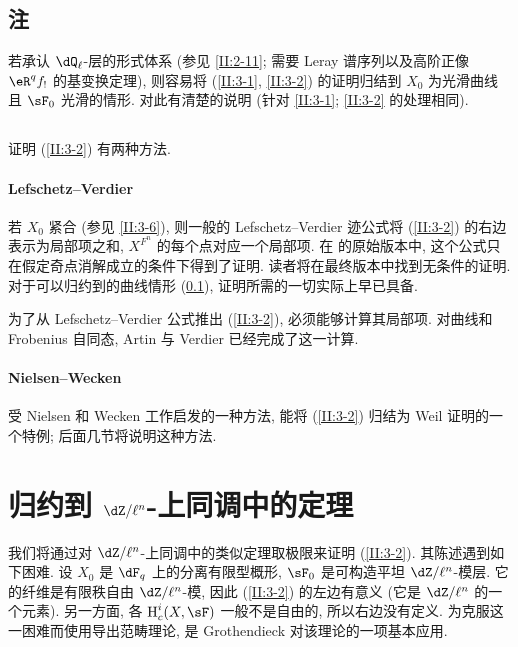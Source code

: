 \subsection{注}\label{II:3-7}

若承认 $\dQ_\ell$-层的形式体系 (参见 \ref{II:2-11}; 需要 Leray 谱序列以及高阶正像 $\eR^q f_!$ 的基变换定理), 则容易将 (\ref{II:3-1}, \ref{II:3-2}) 的证明归结到 $X_0$ 为光滑曲线且 $\sF_0$ 光滑的情形. \cite[\S 5]{gr95} 对此有清楚的说明 (针对 \ref{II:3-1}; \ref{II:3-2} 的处理相同).

\subsection{}\label{II:3-8}

证明 (\ref{II:3-2}) 有两种方法.

\paragraph{Lefschetz--Verdier}
若 $X_0$ 紧合 (参见 \ref{II:3-6}), 则一般的 Lefschetz--Verdier 迹公式将 (\ref{II:3-2}) 的右边表示为局部项之和, $X^{F^n}$ 的每个点对应一个局部项. 在 \cite{sga5} 的原始版本中, 这个公式只在假定奇点消解成立的条件下得到了证明. 读者将在最终版本中找到无条件的证明. 对于可以归约到的曲线情形 (\ref{II:3-7}), 证明所需的一切实际上早已具备.

为了从 Lefschetz--Verdier 公式推出 (\ref{II:3-2}), 必须能够计算其局部项. 对曲线和 Frobenius 自同态, Artin 与 Verdier \cite{ve67} 已经完成了这一计算.

\paragraph{Nielsen--Wecken}
受 Nielsen 和 Wecken 工作启发的一种方法, 能将 (\ref{II:3-2}) 归结为 Weil 证明的一个特例; 后面几节将说明这种方法.

\section{归约到 \texorpdfstring{$\dZ/\ell^n$}{Z/l n}-上同调中的定理}\label{II:4}

我们将通过对 $\dZ/\ell^n$-上同调中的类似定理取极限来证明 (\ref{II:3-2}). 其陈述遇到如下困难. 设 $X_0$ 是 $\dF_q$ 上的分离有限型概形, $\sF_0$ 是可构造平坦 $\dZ/\ell^n$-模层. 它的纤维是有限秩自由 $\dZ/\ell^n$-模, 因此 (\ref{II:3-2}) 的左边有意义 (它是 $\dZ/\ell^n$ 的一个元素). 另一方面, 各 $\h_c^i(X,\sF)$ 一般不是自由的, 所以右边没有定义. 为克服这一困难而使用导出范畴理论, 是 Grothendieck 对该理论的一项基本应用.

